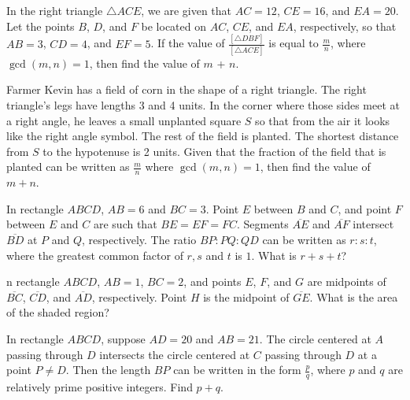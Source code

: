 \documentclass{article}
\begin{document}

\begin{prob}[AMC 10B 2004/18]{3}
In the right triangle $\triangle ACE$, we are given that  $AC=12$, $CE=16$, and $EA=20$. Let the points $B$, $D$, and $F$ be located on $AC$, $CE$, and $EA$, respectively, so that $AB=3$, $CD=4$, and $EF=5$. If the value of $\frac{[\triangle DBF]}{[\triangle ACE]}$ is equal to $\frac{m}{n}$, where $\gcd(m,n)=1$, then find the value of $m$ + $n$.
\end{prob}

\begin{prob}[AMC 10A 2018/23]{3}
Farmer Kevin has a field of corn in the shape of a right triangle. The right triangle's legs have lengths 3 and 4 units. In the corner where those sides meet at a right angle, he leaves a small unplanted square $S$ so that from the air it looks like the right angle symbol. The rest of the field is planted. The shortest distance from $S$ to the hypotenuse is 2 units. Given that the fraction of the field that is planted can be written as $\frac{m}{n}$ where $\gcd(m,n)=1$, then find the value of $m+n$.
\begin{center}
    
\end{center}
\end{prob}

\begin{prob}[AMC 10A 2016/19]{3}
In rectangle $ABCD$, $AB=6$ and $BC=3$. Point $E$ between $B$ and $C$, and point $F$ between $E$ and $C$ are such that $BE=EF=FC$. Segments $\overline{AE}$ and $\overline{AF}$ intersect $\overline{BD}$ at $P$ and $Q$, respectively. The ratio $BP:PQ:QD$ can be written as $r:s:t$, where the greatest common factor of $r,s$ and $t$ is $1$. What is $r+s+t$?
\end{prob}

\begin{prob}[AMC 10A 2014/16]{3}
n rectangle $ABCD$, $AB=1$, $BC=2$, and points $E$, $F$, and $G$ are midpoints of $\overline{BC}$, $\overline{CD}$, and $\overline{AD}$, respectively. Point $H$ is the midpoint of $\overline{GE}$. What is the area of the shaded region?
\begin{center}
    
\end{center}

\end{prob}

\begin{prob}[CIME I 2021/5]{4}
In rectangle $ABCD$, suppose $AD = 20$ and $AB = 21$. The circle centered at $A$ passing through $D$ intersects the circle centered at $C$ passing through $D$ at a point $P \neq D$. Then the length $BP$ can be written in the form $\frac{p}{q}$, where $p$ and $q$ are relatively prime positive integers. Find $p + q$.
\end{prob}
\end{document}
